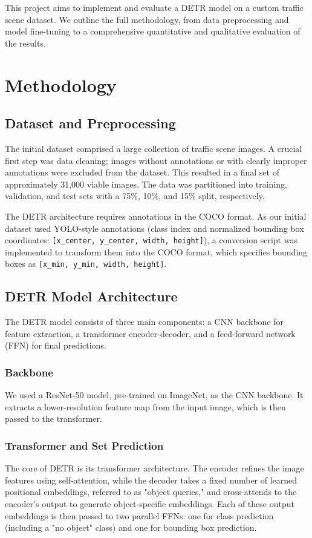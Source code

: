 \documentclass[10pt, conference]{IEEEtran}
\begin{document}
This project aims to implement and evaluate a DETR model on a custom traffic scene dataset. We outline the full methodology, from data preprocessing and model fine-tuning to a comprehensive quantitative and qualitative evaluation of the results.

\section{Methodology}

\subsection{Dataset and Preprocessing}
The initial dataset comprised a large collection of traffic scene images. A crucial first step was data cleaning; images without annotations or with clearly improper annotations were excluded from the dataset. This resulted in a final set of approximately 31,000 viable images. The data was partitioned into training, validation, and test sets with a 75\%, 10\%, and 15\% split, respectively.

The DETR architecture requires annotations in the COCO format. As our initial dataset used YOLO-style annotations (class index and normalized bounding box coordinates: \texttt{[x\_center, y\_center, width, height]}), a conversion script was implemented to transform them into the COCO format, which specifies bounding boxes as \texttt{[x\_min, y\_min, width, height]}.

\subsection{DETR Model Architecture}
The DETR model consists of three main components: a CNN backbone for feature extraction, a transformer encoder-decoder, and a feed-forward network (FFN) for final predictions.

\subsubsection{Backbone}
We used a ResNet-50 model, pre-trained on ImageNet, as the CNN backbone. It extracts a lower-resolution feature map from the input image, which is then passed to the transformer.

\subsubsection{Transformer and Set Prediction}
The core of DETR is its transformer architecture. The encoder refines the image features using self-attention, while the decoder takes a fixed number of learned positional embeddings, referred to as "object queries," and cross-attends to the encoder's output to generate object-specific embeddings. Each of these output embeddings is then passed to two parallel FFNs: one for class prediction (including a "no object" class) and one for bounding box prediction.
\end{document}
